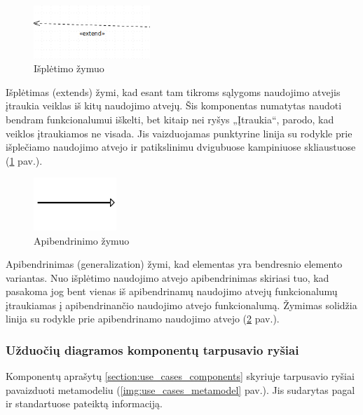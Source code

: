 \begin{figure}[H]
	\centering
	\includegraphics[height=2cm]{img/use_case_components/extend}
	\caption{Išplėtimo žymuo}
	\label{img:use_case_components_extends}
\end{figure}

Išplėtimas (extends) žymi, kad esant tam tikroms sąlygoms naudojimo atvejis įtraukia veiklas iš kitų naudojimo atvejų. Šis komponentas numatytas naudoti bendram funkcionalumui iškelti, bet kitaip nei ryšys „Įtraukia“, parodo, kad veiklos įtraukiamos ne visada. Jis vaizduojamas punktyrine linija su rodykle prie išplečiamo naudojimo atvejo ir patikslinimu dvigubuose kampiniuose skliaustuose (\ref{img:use_case_components_extends} pav.).

\begin{figure}[H]
	\centering
	\includegraphics[height=2cm]{img/use_case_components/generalization}
	\caption{Apibendrinimo žymuo}
	\label{img:use_case_components_generalization}
\end{figure}

Apibendrinimas (generalization) žymi, kad elementas yra bendresnio elemento variantas. Nuo išplėtimo naudojimo atvejo apibendrinimas skiriasi tuo, kad pasakoma jog bent vienas iš apibendrinamų naudojimo atvejų funkcionalumų įtraukiamas į apibendrinančio naudojimo atvejo funkcionalumą. Žymimas solidžia linija su rodykle prie apibendrinamo naudojimo atvejo (\ref{img:use_case_components_generalization} pav.).

\subsubsection{Užduočių diagramos komponentų tarpusavio ryšiai}

Komponentų aprašytų \ref{section:use_cases_components} skyriuje tarpusavio ryšiai  pavaizduoti metamodeliu (\ref{img:use_cases_metamodel} pav.). Jis sudarytas pagal \UML{} ir \SysML{} standartuose pateiktą informaciją.


